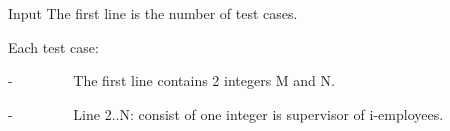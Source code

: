 Input
The first line is the number of test cases.  

   Each test case:  

   -         The first line contains 2 integers M and N.  

   -         Line 2..N: consist of one integer is supervisor of i-employees.